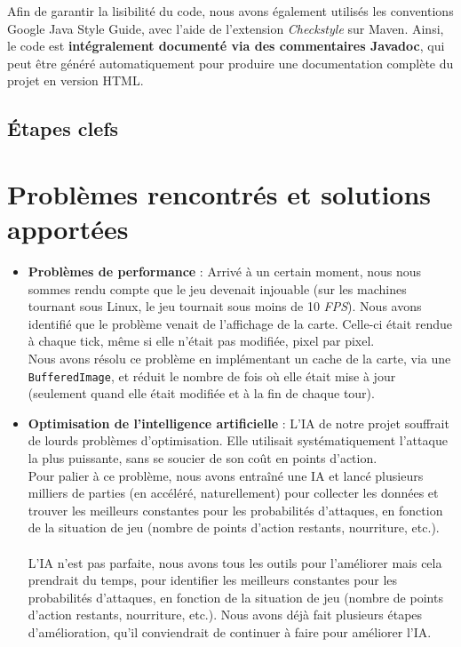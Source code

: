 \documentclass{article}
\begin{document}
\noindent Afin de garantir la lisibilité du code, nous avons également utilisés les conventions Google Java Style Guide, avec l'aide de l'extension \textit{Checkstyle} sur Maven. Ainsi, le code est \textbf{intégralement documenté via des commentaires Javadoc}, qui peut être généré automatiquement pour produire une documentation complète du projet en version HTML.

\subsection{Étapes clefs}

\section{Problèmes rencontrés et solutions apportées}
\begin{itemize}
    \item \textbf{Problèmes de performance} : Arrivé à un certain moment, nous nous sommes rendu compte que le jeu devenait injouable (sur les machines tournant sous Linux, le jeu tournait sous moins de 10 \textit{FPS}). Nous avons identifié que le problème venait de l'affichage de la carte. Celle-ci était rendue à chaque tick, même si elle n'était pas modifiée, pixel par pixel.\\
    Nous avons résolu ce problème en implémentant un cache de la carte, via une \texttt{BufferedImage}, et réduit le nombre de fois où elle était mise à jour (seulement quand elle était modifiée et à la fin de chaque tour).
    \item \textbf{Optimisation de l'intelligence artificielle} : L'IA de notre projet souffrait de lourds problèmes d'optimisation. Elle utilisait systématiquement l'attaque la plus puissante, sans se soucier de son coût en points d'action.\\
    Pour palier à ce problème, nous avons entraîné une IA et lancé plusieurs milliers de parties (en accéléré, naturellement) pour collecter les données et trouver les meilleurs constantes pour les probabilités d'attaques, en fonction de la situation de jeu (nombre de points d'action restants, nourriture, etc.).\\\\
    L'IA n'est pas parfaite, nous avons tous les outils pour l'améliorer mais cela prendrait du temps, pour identifier les meilleurs constantes pour les probabilités d'attaques, en fonction de la situation de jeu (nombre de points d'action restants, nourriture, etc.). Nous avons déjà fait plusieurs étapes d'amélioration, qu'il conviendrait de continuer à faire pour améliorer l'IA.
\end{itemize}
\end{document}
